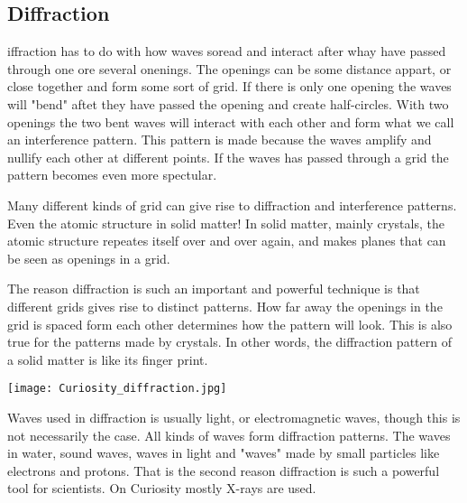 \subsection{Diffraction}
iffraction has to do with how waves soread and interact after whay have passed through one ore several onenings.
The openings can be some distance appart, or close together and form some sort of grid.
If there is only one opening the waves will "bend" aftet they have passed the opening and create half-circles.
With two openings the two bent waves will interact with each other and form what we call an interference pattern.
This pattern is made because the waves amplify and nullify each other at different points.
If the waves has passed through a grid the pattern becomes even more spectular.

Many different kinds of grid can give rise to diffraction and interference patterns.
Even the atomic structure in solid matter!
In solid matter, mainly crystals, the atomic structure repeates itself over and over again, and makes planes that can be seen as openings in a grid.

The reason diffraction is such an important and powerful technique is that different grids gives rise to distinct patterns.
How far away the openings in the grid is spaced form each other determines how the pattern will look.
This is also true for the patterns made by crystals.
In other words, the diffraction pattern of a solid matter is like its finger print.

\begin{center}
	\texttt{[image: Curiosity\_diffraction.jpg]}
\end{center}

Waves used in diffraction is usually light, or electromagnetic waves, though this is not necessarily the case.
All kinds of waves form diffraction patterns.
The waves in water, sound waves, waves in light and "waves" made by small particles like electrons and protons.
That is the second reason diffraction is such a powerful tool for scientists.
On Curiosity mostly X-rays are used.